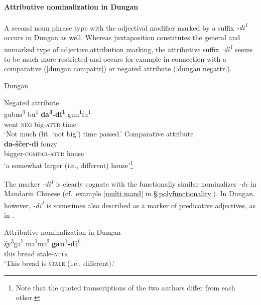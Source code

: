 \paragraph*{Attributive nominalization in Dungan}
A second noun phrase type with the adjectival modifier marked by a suffix \textit{-di\textsuperscript{1}} occurs in Dungan as well. Whereas juxtaposition constitutes the general and unmarked type of adjective attribution marking, the attributive suffix \textit{-di\textsuperscript{1}} seems to be much more restricted and occurs for example in connection with a comparative (\ref{dungan compattr}) or negated attribute (\ref{dungan negattr}).
\begin{exe}
\ex \rm{Dungan}
\begin{xlist}
\ex \rm{Negated attribute \citep[80]{zevachina2001}}\\
\label{dungan negattr}
\gll	gubuə\textsuperscript{3} bu\textsuperscript{1} \textbf{da\textsuperscript{3}-di\textsuperscript{1}} gun\textsuperscript{1}fu\textsuperscript{1}\\
	went \textsc{neg} big-\textsc{attr} time\\
\glt	‘Not much (lit. ‘not big’) time passed.’
\ex \rm{Comparative attribute \citep[480]{kalimov1968}}\\
\label{dungan compattr}
\gll	\textbf{da-ščer-di} fonzy\\
	bigger-\textsc{compar}-\textsc{attr} house\\
\glt	‘a somewhat larger (i.e., different) house’\footnote{Note that the quoted transcriptions of the two authors differ from each other.}
\end{xlist}
\end{exe}	
The marker \textit{-di\textsuperscript{1}} is clearly cognate with the functionally similar nominalizer \textit{-de} in Mandarin Chinese (cf.~example \ref{multi mand} in \S\ref{polyfunctionality}). In Dungan, however, \textit{-di\textsuperscript{1}} is sometimes also described as a marker of predicative adjectives, as in .
\begin{exe}
\ex \rm{Attributive nominalization in Dungan \citep[82]{zevachina2001}}\\
\label{dungan emphpred}
\gll	ž̨y\textsuperscript{3}gə\textsuperscript{1} mə\textsuperscript{1}mə\textsuperscript{2} \textbf{gan\textsuperscript{1}-di\textsuperscript{1}}\\
	this bread stale-\textsc{attr}\\
\glt	‘This bread is \textsc{stale} (i.e., different).’
\end{exe}
